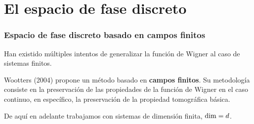 \documentclass[10pt]{beamer}
\let\H\relax
\DeclareMathOperator{\H}{\mathcal H}
\begin{document}







  \section{El espacio de fase discreto}

  \begin{frame}
    \frametitle{Espacio de fase discreto basado en campos
    finitos}

    Han existido múltiples intentos de generalizar la
    función de Wigner al caso de sistemas finitos.

    \vspace{15pt}

    Wootters (2004) propone un método basado en
    \textbf{campos finitos}. Su metodología consiste en la
    preservación de las propiedades de la función de Wigner
    en el caso continuo, en específico, la preservación de
    la propiedad tomográfica básica.

    \pause

    \vspace{15pt}

    De aquí en adelante trabajamos con sistemas de dimensión
    finita, $\dim \H = d$.
  \end{frame}
\end{document}

